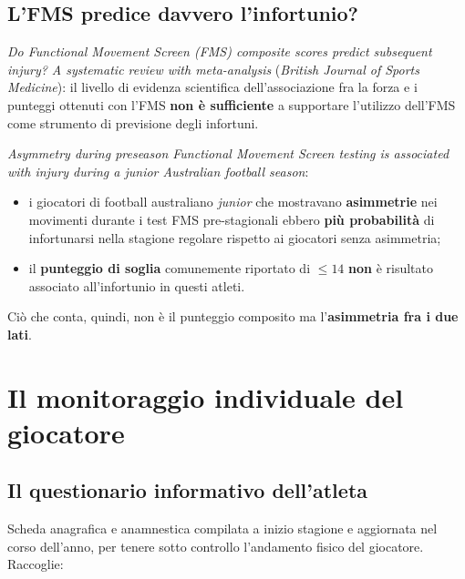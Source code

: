 \subsection{L'FMS predice davvero l'infortunio?}

\textit{Do Functional Movement Screen (FMS) composite scores predict subsequent injury? A systematic
review with meta-analysis} (\textit{British Journal of Sports Medicine}): il livello di evidenza
scientifica dell'associazione fra la forza e i punteggi ottenuti con l'FMS \textbf{non è
sufficiente} a supportare l'utilizzo dell'FMS come strumento di previsione degli infortuni.

\textit{Asymmetry during preseason Functional Movement Screen testing is associated with injury
during a junior Australian football season}:

\begin{itemize}
  \item i giocatori di football australiano \textit{junior} che mostravano \textbf{asimmetrie} nei
    movimenti durante i test FMS pre-stagionali ebbero \textbf{più probabilità} di infortunarsi
    nella stagione regolare rispetto ai giocatori senza asimmetria;
  \item il \textbf{punteggio di soglia} comunemente riportato di $\leq 14$ \textbf{non} è risultato
    associato all'infortunio in questi atleti.
\end{itemize}

Ciò che conta, quindi, non è il punteggio composito ma l'\textbf{asimmetria fra i due lati}.

\section{Il monitoraggio individuale del giocatore}

\subsection{Il questionario informativo dell'atleta}

Scheda anagrafica e anamnestica compilata a inizio stagione e aggiornata nel corso dell'anno, per
tenere sotto controllo l'andamento fisico del giocatore. Raccoglie:

